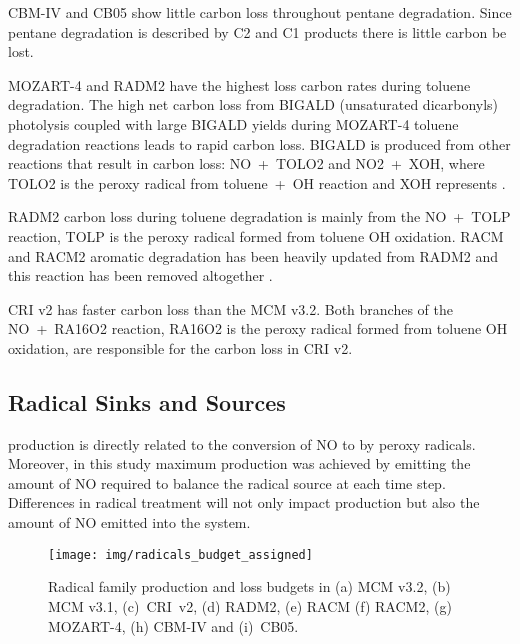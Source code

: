 CBM-IV and CB05 show little carbon loss throughout pentane degradation.
Since pentane degradation is described by C2 and C1 products there is little carbon be lost.

MOZART-4 and RADM2 have the highest loss carbon rates during toluene degradation.
The high net carbon loss from BIGALD (unsaturated dicarbonyls) photolysis coupled with large BIGALD yields during MOZART-4 toluene degradation reactions leads to rapid carbon loss.
BIGALD is produced from other reactions that result in carbon loss: \mbox{NO + TOLO2} and \mbox{NO2 + XOH}, where TOLO2 is the peroxy radical from \mbox{toluene + OH} reaction and XOH represents  \citep{Emmons:2010}.

RADM2 carbon loss during toluene degradation is mainly from the \mbox{NO + TOLP} reaction, TOLP is the peroxy radical formed from toluene OH oxidation.
RACM and RACM2 aromatic degradation has been heavily updated from RADM2 and this reaction has been removed altogether \citep{Stockwell:1997, Goliff:2013}.

CRI v2 has faster carbon loss than the MCM v3.2.
Both branches of the \mbox{NO + RA16O2} reaction, RA16O2 is the peroxy radical formed from toluene OH oxidation, are responsible for the carbon loss in CRI v2.

\subsection{Radical Sinks and Sources} \label{ss:radicals}

 production is directly related to the conversion of NO to  by peroxy radicals. 
Moreover, in this study maximum  production was achieved by emitting the amount of NO required to balance the radical source at each time step. 
Differences in radical treatment will not only impact  production but also the amount of NO emitted into the system.

\begin{figure}
    \centering
    \texttt{[image: img/radicals\_budget\_assigned]}
    \vspace{0mm}
    \caption{Radical family production and loss budgets in (a) MCM v3.2, (b) MCM v3.1, \mbox{(c) CRI v2}, (d) RADM2, (e) RACM (f) RACM2, (g) MOZART-4, (h) CBM-IV and \mbox{(i) CB05}.}
    \vspace{-4mm}
    \label{f:radical_budgets} 
\end{figure} 


